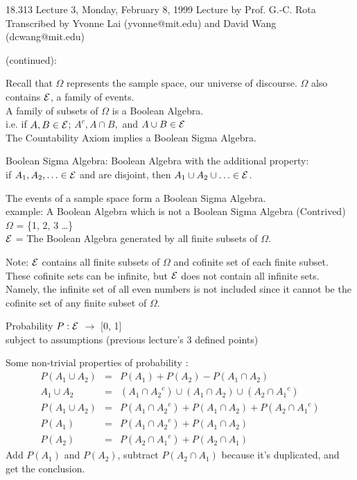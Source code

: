 {\Large 18.313 Lecture 3, Monday, February 8, 1999}\newline 
{\large Lecture by Prof. G.-C. Rota}\newline 
Transcribed by Yvonne Lai (yvonne@mit.edu) and David Wang (dcwang@mit.edu)\newline

 (continued):

Recall that $\Omega$ represents the sample space, our universe of discourse. $\Omega$ also contains $\cal{E}$, a family of events.\\
A family of subsets of $\Omega$ is a Boolean Algebra.\\
i.e. if $A, B \in \cal{E}$; $A^{c}, A \cap B, $ and $A \cup B \in \cal{E}$\\
The Countability Axiom implies a Boolean Sigma Algebra.

Boolean Sigma Algebra: Boolean Algebra with the additional property:\\
if $A_1, A_2, \ldots \in \cal{E}$ and are disjoint, then $A_1 \cup A_2 \cup \ldots \in \cal{E}$.

The events of a sample space form a Boolean Sigma Algebra.\\
example: A Boolean Algebra which is not a Boolean Sigma Algebra (Contrived)\\
$\Omega$ = \{1, 2, 3 \ldots\}\\
$\cal{E}$ = The Boolean Algebra generated by all finite subsets of $\Omega$.

Note: $\cal{E}$ contains all finite subsets of $\Omega$ and cofinite set of each finite subset.  These cofinite sets can be infinite, but $\cal{E}$ does not contain all infinite sets.  Namely, the infinite set of all even numbers is not included since it cannot be the cofinite set of any finite subset of $\Omega$.

Probability $P : \cal{E}$ $\rightarrow$ [0, 1]\\
subject to assumptions (previous lecture's 3 defined points)

Some non-trivial properties of probability :
\begin{eqnarray*}
P(A_1 \cup A_2) &=& P(A_1) + P(A_2) - P(A_1 \cap A_2)\\
A_1 \cup A_2 &=& (A_1 \cap {A_2}^{c}) \cup (A_1 \cap A_2) \cup (A_2 \cap {A_1}^{c})\\
P(A_1 \cup A_2) &=& P(A_1 \cap {A_2}^{c}) + P(A_1 \cap A_2) + P(A_2 \cap {A_1}^{c})\\
P(A_1) &=& P(A_1 \cap {A_2}^{c}) + P(A_1 \cap A_2)\\
P(A_2) &=& P(A_2 \cap {A_1}^{c}) + P(A_2 \cap A_1)
\end{eqnarray*}
Add $P(A_1)$ and $P(A_2)$, subtract $P(A_2 \cap A_1)$ because it's duplicated, and get the conclusion.

